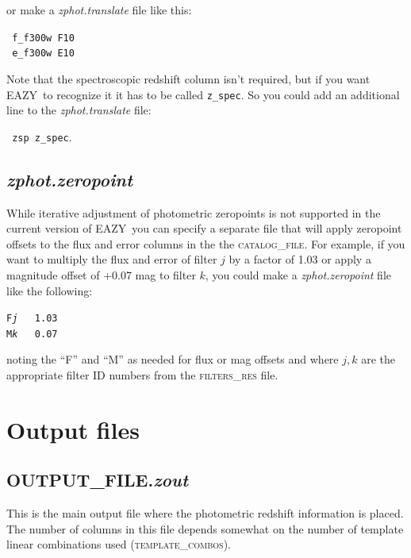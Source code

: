 \documentclass[11pt]{article}
\newcommand{\eazy}{\textsc{EAZY}}
\begin{document}
or make a \textit{zphot.translate} file like this:

\noindent \texttt{ f\_f300w   F10}\\
\texttt{ e\_f300w  E10}

Note that the spectroscopic redshift column isn't required,
but if you want \eazy\ to recognize it it has to be called
\texttt{z\_spec}.  So you could add an additional line to
the \textit{zphot.translate} file:

\texttt{  zsp  z\_spec}.

    \subsection{\textit{zphot.zeropoint} \label{zeropoint}}
    
	While iterative adjustment of photometric zeropoints is
	not supported in the current version of \eazy\, you can
	specify a separate file that will apply zeropoint
	offsets to the flux and error columns in the the
	\textsc{catalog\_file}.  For example, if you want to
	multiply the flux and error of filter $j$ by a factor of
	1.03 or apply a magnitude offset of +0.07 mag to filter
	$k$, you could make a \textit{zphot.zeropoint} file like
	the following:

\texttt{F\textit{j}\ \ \ 1.03\\M\textit{k}\ \ \ 0.07}

noting the ``F'' and ``M'' as needed for flux or mag offsets and
where $j, k$ are the appropriate filter ID numbers from the
\textsc{filters\_res} file.


\section{Output files \label{all_output}}
  
    \subsection{\textrm{OUTPUT\_FILE.}\textit{zout} \label{zout}}
    
	This is the main output file where the photometric
	redshift information is placed.  The number of columns
	in this file depends somewhat on the number of template
	linear combinations used (\textsc{template\_combos}).
\end{document}
